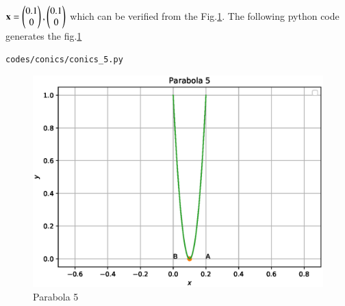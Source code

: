 \begin{enumerate}[label=\arabic*.,ref=\thesubsection.\theenumi]
\begin{enumerate}
$\mathbf{x}= \begin{pmatrix}0.1\\0\end{pmatrix}, \begin{pmatrix}0.1\\0\end{pmatrix}$
which can be verified from the Fig.\ref{fig:parabola_5}.
The following python code generates the fig.\ref{fig:parabola_5}
\begin{lstlisting}
codes/conics/conics_5.py
\end{lstlisting}
\begin{figure}[!ht]
\includegraphics[width=\columnwidth]{./codes/conics/conics_5.eps}
\caption{Parabola 5}
\label{fig:parabola_5}
\end{figure} 

\end{enumerate}

\end{enumerate}
